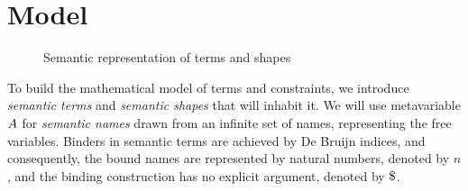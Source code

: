 \documentclass[english, mgr]{iithesis}
\renewcommand{\it}[1]{\textit{#1}}
\begin{document}
\section{Model}
\begin{figure}[htbp]
  \centering
  \caption{Semantic representation of terms and shapes}
  \label{fig:semantic-terms-shapes}
\end{figure}
To build the mathematical model of terms and constraints,
we introduce \it{semantic terms} and \it{semantic shapes} that will inhabit it.
We will use metavariable $A$ for \it{semantic names} drawn from an
infinite set of names, representing the free variables.
Binders in semantic terms are achieved by De Bruijn indices\cite{deBruijn}, and consequently,
the bound names are represented by natural numbers, denoted by $n$,
and the binding construction has no explicit argument, denoted by $\stbind$.
\end{document}
